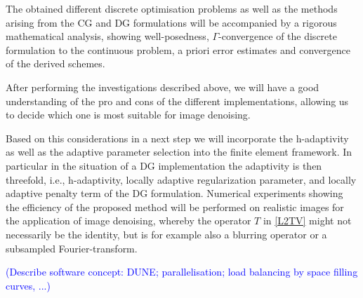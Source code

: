 \documentclass[enabledeprecatedfontcommands,cleardoublepage=empty,headsepline,twoside,11pt,DIV=15,BCOR=12mm,final]{scrartcl}
\begin{document}
  The obtained different discrete optimisation problems as well as the methods arising from the CG and DG formulations will be accompanied by a rigorous mathematical analysis, showing well-posedness,  $\Gamma$-convergence of the discrete formulation to the continuous problem, a priori error estimates and convergence of the derived schemes.
  
  After performing the investigations described above, we will have a good understanding of the pro and cons of the different implementations, allowing us to decide which one is most suitable for image denoising. 

Based on this considerations in a next step we will incorporate the h-adaptivity as well as the adaptive parameter selection into the finite element framework. In particular in the situation of a DG implementation the adaptivity is then threefold, i.e., h-adaptivity, locally adaptive regularization parameter, and locally adaptive penalty term of the DG formulation. Numerical experiments showing the efficiency of the proposed method will be performed on realistic images for the application of image denoising, whereby the operator $T$ in \eqref{L2TV} might not necessarily be the identity, but is for example also a blurring operator or a subsampled Fourier-transform.

\textcolor{blue}{(Describe software concept: DUNE; parallelisation; load balancing by space filling curves, ...)}

  
\end{document}
